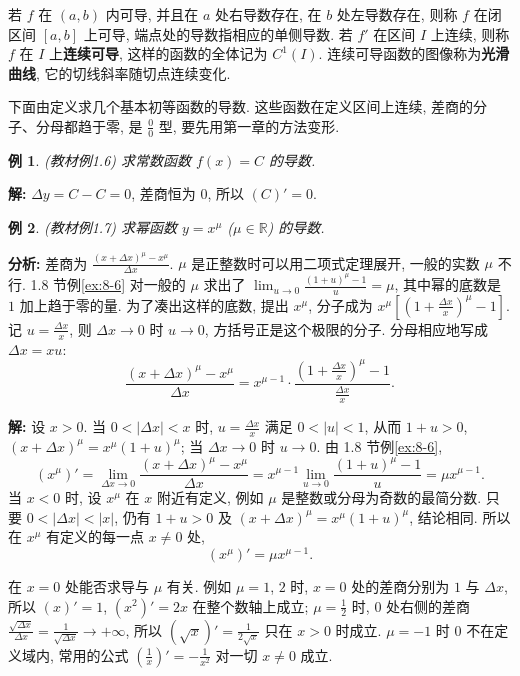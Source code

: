 \documentclass[UTF8,openany]{ctexbook}
\theoremstyle{chinesetextbook}
\newtheorem{example}{例}[section]
\newenvironment{cnsolution}{\par\indent\textbf{解:} \ignorespaces}{\par}
\begin{document}
若 $f$ 在 $(a,b)$ 内可导, 并且在 $a$ 处右导数存在, 在 $b$ 处左导数存在, 则称 $f$ 在闭区间 $[a,b]$ 上可导, 端点处的导数指相应的单侧导数. 若 $f'$ 在区间 $I$ 上连续, 则称 $f$ 在 $I$ 上\textbf{连续可导}, 这样的函数的全体记为 $C^1(I)$. 连续可导函数的图像称为\textbf{光滑曲线}, 它的切线斜率随切点连续变化.

下面由定义求几个基本初等函数的导数. 这些函数在定义区间上连续, 差商的分子、分母都趋于零, 是 $\displaystyle\frac00$ 型, 要先用第一章的方法变形.
\begin{example}\label{ex:c2-1-6}
\textnormal{(教材例1.6)} 求常数函数 $f(x)=C$ 的导数.
\end{example}
\begin{cnsolution}
$\Delta y=C-C=0$, 差商恒为 $0$, 所以 $(C)'=0$.
\end{cnsolution}
\begin{example}\label{ex:c2-1-7}
\textnormal{(教材例1.7)} 求幂函数 $y=x^\mu$ ($\mu\in\mathbb R$) 的导数.
\end{example}
\par\indent\textbf{分析:} 差商为 $\displaystyle\frac{(x+\Delta x)^\mu-x^\mu}{\Delta x}$. $\mu$ 是正整数时可以用二项式定理展开, 一般的实数 $\mu$ 不行. 1.8 节例\ref{ex:8-6} 对一般的 $\mu$ 求出了 $\displaystyle\lim_{u\to0}\frac{(1+u)^\mu-1}u=\mu$, 其中幂的底数是 $1$ 加上趋于零的量. 为了凑出这样的底数, 提出 $x^\mu$, 分子成为 $\displaystyle x^\mu\left[\left(1+\frac{\Delta x}x\right)^\mu-1\right]$. 记 $\displaystyle u=\frac{\Delta x}x$, 则 $\Delta x\to0$ 时 $u\to0$, 方括号正是这个极限的分子. 分母相应地写成 $\Delta x=xu$:
\[
\frac{(x+\Delta x)^\mu-x^\mu}{\Delta x}=x^{\mu-1}\cdot\frac{\left(1+\frac{\Delta x}x\right)^\mu-1}{\frac{\Delta x}x}.
\]
\begin{cnsolution}
设 $x>0$. 当 $0<|\Delta x|<x$ 时, $\displaystyle u=\frac{\Delta x}x$ 满足 $0<|u|<1$, 从而 $1+u>0$, $(x+\Delta x)^\mu=x^\mu(1+u)^\mu$; 当 $\Delta x\to0$ 时 $u\to0$. 由 1.8 节例\ref{ex:8-6},
\[
(x^\mu)'=\lim_{\Delta x\to0}\frac{(x+\Delta x)^\mu-x^\mu}{\Delta x}=x^{\mu-1}\lim_{u\to0}\frac{(1+u)^\mu-1}u=\mu x^{\mu-1}.
\]
当 $x<0$ 时, 设 $x^\mu$ 在 $x$ 附近有定义, 例如 $\mu$ 是整数或分母为奇数的最简分数. 只要 $0<|\Delta x|<|x|$, 仍有 $1+u>0$ 及 $(x+\Delta x)^\mu=x^\mu(1+u)^\mu$, 结论相同. 所以在 $x^\mu$ 有定义的每一点 $x\ne0$ 处,
\[
(x^\mu)'=\mu x^{\mu-1}.
\]
\end{cnsolution}
在 $x=0$ 处能否求导与 $\mu$ 有关. 例如 $\mu=1$, $2$ 时, $x=0$ 处的差商分别为 $1$ 与 $\Delta x$, 所以 $(x)'=1$, $(x^2)'=2x$ 在整个数轴上成立; $\displaystyle\mu=\frac12$ 时, $0$ 处右侧的差商 $\displaystyle\frac{\sqrt{\Delta x}}{\Delta x}=\frac1{\sqrt{\Delta x}}\to+\infty$, 所以 $\displaystyle\left(\sqrt x\right)'=\frac1{2\sqrt x}$ 只在 $x>0$ 时成立. $\mu=-1$ 时 $0$ 不在定义域内, 常用的公式 $\displaystyle\left(\frac1x\right)'=-\frac1{x^2}$ 对一切 $x\ne0$ 成立.
\end{document}
